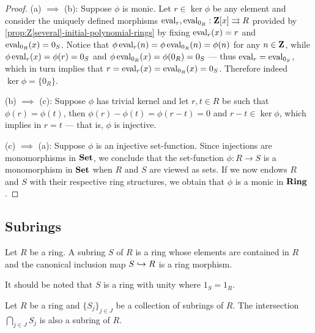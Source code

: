 %
\begin{proof}
(a) \(\implies\) (b): Suppose \(\phi\) is monic. Let \(r \in \ker \phi\) be any
element and consider the uniquely defined morphisms
\(\operatorname{eval}_r, \operatorname{eval}_{0_R}: \mathbf{Z}[x] \rightrightarrows R\) provided by
\cref{prop:Z[several]-initial-polynomial-rings} by fixing \(\operatorname{eval}_r(x) = r\) and
\(\operatorname{eval}_{0_R}(x) = 0_S\). Notice that
\(\phi \operatorname{eval}_r(n) = \phi \operatorname{eval}_{0_R}(n) = \phi(n)\) for any \(n \in \mathbf{Z}\), while
\(\phi \operatorname{eval}_r(x) = \phi(r) = 0_S\) and
\(\phi \operatorname{eval}_{0_R}(x) = \phi(0_R) = 0_S\) --- thus \(\operatorname{eval}_r = \operatorname{eval}_{0_S}\),
which in turn implies that \(r = \operatorname{eval}_r(x) = \operatorname{eval}_{0_R}(x) = 0_S\). Therefore
indeed \(\ker \phi = \{0_R\}\).

(b) \(\implies\) (c): Suppose \(\phi\) has trivial kernel and let \(r, t \in R\)
be such that \(\phi(r) = \phi(t)\), then \(\phi(r) - \phi(t) = \phi(r - t) = 0\)
and \(r - t \in \ker \phi\), which implies in \(r = t\) --- that is, \(\phi\) is
injective.

(c) \(\implies\) (a): Suppose \(\phi\) is an injective set-function. Since
injections are monomorphisms in \({\textbf{Set}}\), we conclude that the set-function
\(\phi: R \to S\) is a monomorphism in \({\textbf{Set}}\) when \(R\) and \(S\) are viewed
as sets. If we now endows \(R\) and \(S\) with their respective ring structures,
we obtain that \(\phi\) is a monic in \({\textbf{Ring}}\).
\end{proof}
%

\subsection{Subrings}

%
\begin{definition}[Subring]
\label{def:subring}
Let \(R\) be a ring. A subring \(S\) of \(R\) is a ring whose elements are
contained in \(R\) and the canonical inclusion map \(S \hookrightarrow R\) is a ring
morphism.
\end{definition}
%

%
\begin{remark}
\label{rem:subring-same-unity}
It should be noted that \(S\) is a ring with unity where \(1_S = 1_R\).
\end{remark}
%

%
\begin{proposition}
\label{prop:intersection-subring-is-subring}
Let \(R\) be a ring and \(\{S_{j}\}_{j \in J}\) be a collection of subrings of
\(R\). The intersection \(\bigcap_{j \in J} S_j\) is also a subring of \(R\).
\end{proposition}
%

